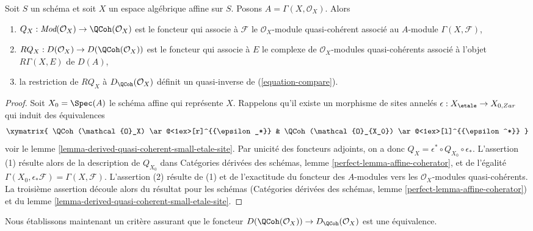 \begin{lemma}
\label{lemma-affine-coherator}
Soit $S$ un sch\'ema et soit $X$ un espace alg\'ebrique affine sur $S$.
Posons $A = \Gamma(X, \mathcal{O}_X)$. Alors
\begin{enumerate}
\item $Q_X : \textit{Mod}(\mathcal{O}_X) \to \QCoh(\mathcal{O}_X)$
est le foncteur qui associe \`a $\mathcal{F}$ le
$\mathcal{O}_X$-module quasi-coh\'erent associ\'e au $A$-module
$\Gamma(X, \mathcal{F})$,
\item $RQ_X : D(\mathcal{O}_X) \to D(\QCoh(\mathcal{O}_X))$
est le foncteur qui associe \`a $E$ le complexe de
$\mathcal{O}_X$-modules quasi-coh\'erents associ\'e \`a l'objet
$R\Gamma(X, E)$ de $D(A)$,
\item la restriction de $RQ_X$ \`a $D_\QCoh(\mathcal{O}_X)$ d\'efinit un
quasi-inverse de (\ref{equation-compare}).
\end{enumerate}
\end{lemma}

\begin{proof}
Soit $X_0 = \Spec(A)$ le sch\'ema affine qui repr\'esente $X$. Rappelons qu'il
existe un morphisme de sites annel\'es
$\epsilon : X_\etale \to X_{0, Zar}$
qui induit des \'equivalences
$$
\xymatrix{
\QCoh(\mathcal{O}_X) \ar@<1ex>[r]^{{\epsilon_*}} &
\QCoh(\mathcal{O}_{X_0}) \ar@<1ex>[l]^{{\epsilon^*}}
}
$$
voir le lemme
\ref{lemma-derived-quasi-coherent-small-etale-site}.
Par unicit\'e des foncteurs adjoints, on a donc
$Q_X = \epsilon^* \circ Q_{X_0} \circ \epsilon_*$. L'assertion (1) r\'esulte
alors de la description de $Q_{X_0}$ dans Cat\'egories d\'eriv\'ees des
sch\'emas, lemme \ref{perfect-lemma-affine-coherator}, et de l'\'egalit\'e
$\Gamma(X_0, \epsilon_*\mathcal{F}) = \Gamma(X, \mathcal{F})$.
L'assertion (2) r\'esulte de (1) et de l'exactitude du foncteur des
$A$-modules vers les $\mathcal{O}_X$-modules quasi-coh\'erents. La troisi\`eme
assertion d\'ecoule alors du r\'esultat pour les sch\'emas (Cat\'egories
d\'eriv\'ees des sch\'emas, lemme \ref{perfect-lemma-affine-coherator}) et du
lemme
\ref{lemma-derived-quasi-coherent-small-etale-site}.
\end{proof}

\noindent
Nous \'etablissons maintenant un crit\`ere assurant que le foncteur
$D(\QCoh(\mathcal{O}_X)) \to D_\QCoh(\mathcal{O}_X)$
est une \'equivalence.

